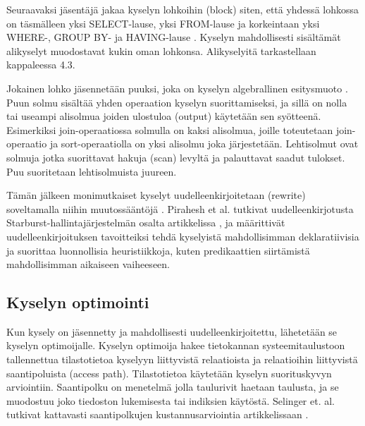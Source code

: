 \documentclass[finnish]{tktltiki2}
\theoremstyle{definition}
\theoremstyle{remark}
\begin{document}
Seuraavaksi jäsentäjä jakaa kyselyn lohkoihin (block) siten, että yhdessä lohkossa on täsmälleen yksi SELECT-lause, yksi FROM-lause ja korkeintaan yksi WHERE-, GROUP BY- ja HAVING-lause \cite{ramakrishnan2003database}. 
Kyselyn mahdollisesti sisältämät alikyselyt muodostavat kukin oman lohkonsa. Alikyselyitä tarkastellaan kappaleessa 4.3.

Jokainen lohko jäsennetään puuksi, joka on kyselyn algebrallinen esitysmuoto \cite{mahajan2012}. 
Puun solmu sisältää yhden operaation kyselyn suorittamiseksi, ja sillä on nolla tai useampi alisolmua joiden ulostuloa (output) käytetään sen syötteenä.
Esimerkiksi join-operaatiossa solmulla on kaksi alisolmua, joille toteutetaan join-operaatio ja sort-operaatiolla on yksi alisolmu joka järjestetään.
Lehtisolmut ovat solmuja jotka suorittavat hakuja (scan) levyltä ja palauttavat saadut tulokset. 
Puu suoritetaan lehtisolmuista juureen.

Tämän jälkeen monimutkaiset kyselyt uudelleenkirjoitetaan (rewrite) soveltamalla niihin muutossääntöjä \cite{ioannidis1996query}. Pirahesh et al. tutkivat uudelleenkirjotusta Starburst-hallintajärjestelmän osalta artikkelissa \cite{pirahesh1992extensible}, ja määrittivät uudelleenkirjoituksen tavoitteiksi tehdä kyselyistä mahdollisimman deklaratiivisia ja suorittaa luonnollisia heuristiikkoja, kuten predikaattien siirtämistä mahdollisimman aikaiseen vaiheeseen.


\subsection{Kyselyn optimointi}
Kun kysely on jäsennetty ja mahdollisesti uudelleenkirjoitettu, lähetetään se kyselyn optimoijalle. Kyselyn optimoija hakee tietokannan systeemitaulustoon tallennettua tilastotietoa kyselyyn liittyvistä relaatioista ja relaatioihin liittyvistä saantipoluista (access path). Tilastotietoa käytetään kyselyn suorituskyvyn arviointiin. Saantipolku on menetelmä jolla taulurivit haetaan taulusta, ja se muodostuu joko tiedoston lukemisesta tai indiksien käytöstä. Selinger et. al. tutkivat kattavasti saantipolkujen kustannusarviointia artikkelissaan \cite{selinger1979access}. 
\end{document}
